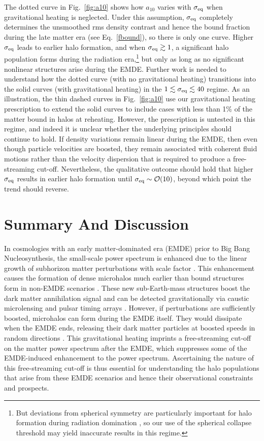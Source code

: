\documentclass[a4paper,11pt]{article}
\newcommand{\seq}{\sigma_{\rm eq}}
\begin{document}
The dotted curve in Fig.~\ref{fig:a10} shows how $a_{10}$ varies with $\seq$ when gravitational heating is neglected. Under this assumption, $\seq$ completely determines the unsmoothed rms density contrast and hence the bound fraction during the late matter era (see Eq.~\ref{fbound}), so there is only one curve.
Higher $\seq$ leads to earlier halo formation, and when $\seq\gtrsim 1$, a significant halo population forms during the radiation era,\footnote{But deviations from spherical symmetry are particularly important for halo formation during radiation domination \cite{2013JCAP...11..059B,2023MNRAS.520.4370D,2023PhRvD.107h3505D}, so our use of the spherical collapse threshold may yield inaccurate results in this regime.} but only as long as no significant nonlinear structures arise during the EMDE.
Further work is needed to understand how the dotted curve (with no gravitational heating) transitions into the solid curves (with gravitational heating) in the $1\lesssim\seq\lesssim 40$ regime.
As an illustration, the thin dashed curves in Fig.~\ref{fig:a10} use our gravitational heating prescription to extend the solid curves to include cases with less than 1\% of the matter bound in halos at reheating. However, the prescription is untested in this regime, and indeed it is unclear whether the underlying principles should continue to hold. If density variations remain linear during the EMDE, then even though particle velocities are boosted, they remain associated with coherent fluid motions rather than the velocity dispersion that is required to produce a free-streaming cut-off.
Nevertheless, the qualitative outcome should hold that higher $\seq$ results in earlier halo formation until $\seq\sim\mathcal{O}(10)$, beyond which point the trend should reverse.


\section{Summary And Discussion}
\label{summary}

In cosmologies with an early matter-dominated era (EMDE) prior to Big Bang Nucleosynthesis, the small-scale power spectrum is enhanced due to the linear growth of subhorizon matter perturbations with scale factor \cite{ae15}. This enhancement causes the formation of dense microhalos much earlier than bound structures form in non-EMDE scenarios \cite{emde2,emde1,ae15}.
These new sub-Earth-mass structures boost the dark matter annihilation signal \cite{ae15,blanco19,sten_gr} and can be detected gravitationally via caustic microlensing \cite{caustic1,caustic2,caustic3,obs_blinov} and pulsar timing arrays \cite{pta1,obs_blinov,pta_sten}.
However, if perturbations are sufficiently boosted, microhalos can form during the EMDE itself. They would dissipate when the EMDE ends, releasing their
dark matter particles at boosted speeds in random directions \cite{blanco19}. This gravitational heating imprints a free-streaming cut-off on the matter power spectrum after the EMDE, which suppresses some of the EMDE-induced enhancement to the power spectrum. Ascertaining the nature of this free-streaming cut-off is thus essential for understanding the halo populations that arise from these EMDE scenarios and hence their observational constraints and prospects.
\end{document}
